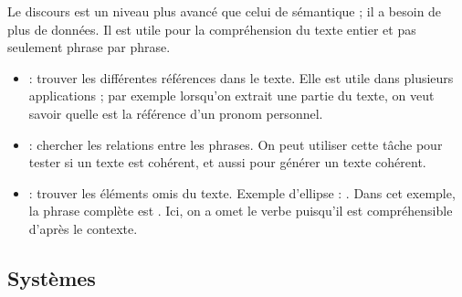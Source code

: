 \documentclass{KodeBook}
\begin{document}
Le discours est un niveau plus avancé que celui de sémantique ; il a besoin de plus de données. 
Il est utile pour la compréhension du texte entier et pas seulement phrase par phrase.
\begin{itemize}
	\item {} : trouver les différentes références dans le texte. 
	Elle est utile dans plusieurs applications ; par exemple lorsqu'on extrait une partie du texte, on veut savoir quelle est la référence d'un pronom personnel.
	\item {} : chercher les relations entre les phrases. 
	On peut utiliser cette tâche pour tester si un texte est cohérent, et aussi pour générer un texte cohérent.
	\item {} : trouver les éléments omis du texte. 
	Exemple d'ellipse : .
	Dans cet exemple, la phrase complète est .
	Ici, on a omet le verbe puisqu'il est compréhensible d'après le contexte.
\end{itemize}

\subsection{Systèmes}
\end{document}

